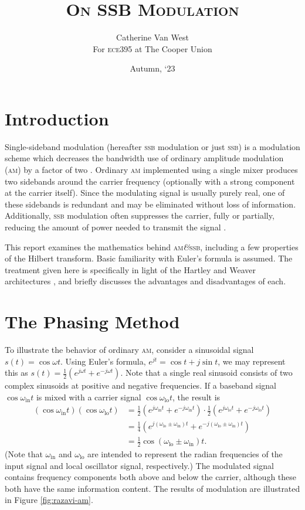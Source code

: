 \documentclass[12pt]{article}
\title{\textsc{On SSB Modulation}}
\author{\vspace{-.8em} Catherine Van West \\
	\normalsize For \textsc{ece395} at The Cooper Union}
\date{Autumn, `23}
\newcommand{\amp}{\textit{\&}\xspace}
\newcommand{\am}{\textsc{am}\xspace}
\newcommand{\ssb}{\textsc{ssb}\xspace}
\begin{document}
\maketitle

\section*{Introduction}
Single-sideband modulation (hereafter \ssb modulation or just \ssb) is a
modulation scheme which decreases the bandwidth use of ordinary amplitude
modulation (\am) by a factor of two \autocite{ssb-thaddeus}. Ordinary \am
implemented using a single mixer produces two sidebands around the carrier
frequency (optionally with a strong component at the carrier itself). Since the
modulating signal is usually purely real, one of these sidebands is redundant
and may be eliminated without loss of information. Additionally, \ssb
modulation often suppresses the carrier, fully or partially, reducing the
amount of power needed to transmit the signal \autocite{weaver-rowell}.

This report examines the mathematics behind \am \amp \ssb, including a few
properties of the Hilbert transform. Basic familiarity with Euler's formula is
assumed. The treatment given here is specifically in light of the Hartley and
Weaver architectures \autocite{rf-microelectronics}, and briefly discusses the
advantages and disadvantages of each.

\section*{The Phasing Method}

\newcommand{\oin}{\omega_\text{in}}
\newcommand{\olo}{\omega_\text{lo}}

To illustrate the behavior of ordinary \am, consider a sinusoidal signal \(s(t)
= \cos \omega t\). Using Euler's formula, \(e^{jt} = \cos t + j \sin t\), we
may represent this as \(s(t) = \frac 1 2 (e^{j \omega t} + e^{- j \omega t})\).
Note that a single real sinusoid consists of two complex sinusoids at positive
and negative frequencies. If a baseband signal \(\cos \oin t\) is mixed with a
carrier signal \(\cos \olo t\), the result is
\begin{align*}
	\left(\cos \oin t\right) \left(\cos \olo t\right)
		&= \frac 1 2 \left(e^{j \oin t} + e^{-j \oin t}\right)
			\cdot \frac 1 2 \left(
				e^{j \olo t} + e^{-j \olo t}
			\right) \\
		&= \frac 1 4 \left(
			e^{j (\olo \pm \oin) t} + e^{-j (\olo \pm \oin) t}
		\right) \\
		&= \frac 1 2 \cos (\olo \pm \oin) t.
\end{align*}
(Note that \(\oin\) and \(\olo\) are intended to represent the radian
frequencies of the input signal and local oscillator signal, respectively.) The
modulated signal contains frequency components both above and below the
carrier, although these both have the same information content. The results of
modulation are illustrated in Figure \ref{fig:razavi-am}.
\end{document}
